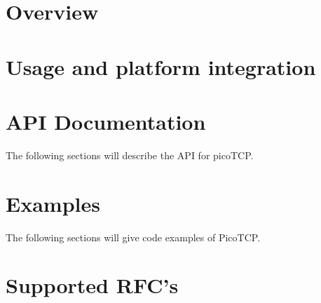 

\tableofcontents

%

\chapter{Overview}
\label{chap:overview}



\chapter{Usage and platform integration}
\label{chap:usage}



\chapter{API Documentation}
\label{chap:api_doc}
The following sections will describe the API for picoTCP.













\chapter{Examples}
\label{chap:examples}
The following sections will give code examples of PicoTCP.



\appendix

%

\chapter{Supported RFC's}
\label{chap:rfcs}



